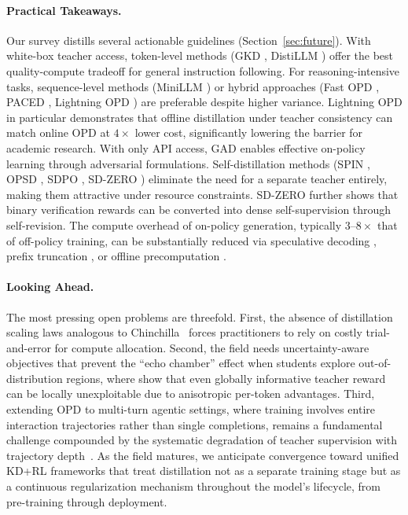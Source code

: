 \documentclass{article} %
\begin{document}
\paragraph{Practical Takeaways.} Our survey distills several actionable guidelines (Section~\ref{sec:future}). With white-box teacher access, token-level methods (GKD \citep{2306.13649}, DistiLLM \citep{2402.03898}) offer the best quality-compute tradeoff for general instruction following. For reasoning-intensive tasks, sequence-level methods (MiniLLM \citep{2306.08543}) or hybrid approaches (Fast OPD \citep{2602.15260}, PACED \citep{2603.11178}, Lightning OPD \citep{wu2026lightning}) are preferable despite higher variance. Lightning OPD in particular demonstrates that offline distillation under teacher consistency can match online OPD at $4\times$ lower cost, significantly lowering the barrier for academic research. With only API access, GAD \citep{2511.10643} enables effective on-policy learning through adversarial formulations. Self-distillation methods (SPIN \citep{2401.01335}, OPSD \citep{2601.18734}, SDPO \citep{2601.20802}, SD-ZERO \citep{he2026selfdistillation}) eliminate the need for a separate teacher entirely, making them attractive under resource constraints. SD-ZERO further shows that binary verification rewards can be converted into dense self-supervision through self-revision. The compute overhead of on-policy generation, typically $3\text{--}8\times$ that of off-policy training, can be substantially reduced via speculative decoding \citep{2410.11325}, prefix truncation \citep{2602.15260}, or offline precomputation \citep{wu2026lightning}.

\paragraph{Looking Ahead.} The most pressing open problems are threefold. First, the absence of distillation scaling laws analogous to Chinchilla~\citep{2203.15556} forces practitioners to rely on costly trial-and-error for compute allocation. Second, the field needs uncertainty-aware objectives that prevent the ``echo chamber'' effect when students explore out-of-distribution regions, where \citet{li2026rethinking} show that even globally informative teacher reward can be locally unexploitable due to anisotropic per-token advantages. Third, extending OPD to multi-turn agentic settings, where training involves entire interaction trajectories rather than single completions, remains a fundamental challenge compounded by the systematic degradation of teacher supervision with trajectory depth~\citep{li2026rethinking}. As the field matures, we anticipate convergence toward unified KD+RL frameworks that treat distillation not as a separate training stage but as a continuous regularization mechanism throughout the model's lifecycle, from pre-training through deployment.




\end{document}
